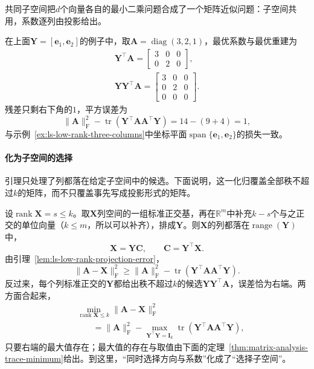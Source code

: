 共同子空间把$d$个向量各自的最小二乘问题合成了一个矩阵近似问题：子空间共用，系数逐列由投影给出。

在上面$\bm Y=[\bm e_1,\bm e_2]$的例子中，取$\bm A=\operatorname{diag}(3,2,1)$，最优系数与最优重建为
\[
 \begin{gathered}
 \bm Y^\top\bm A=\begin{bmatrix}3&0&0\\0&2&0\end{bmatrix},\\
 \bm Y\bm Y^\top\bm A=\begin{bmatrix}3&0&0\\0&2&0\\0&0&0\end{bmatrix}.
 \end{gathered}
\]
残差只剩右下角的$1$，平方误差为
\[
 \lVert\bm A\rVert_{\mathrm F}^2-\operatorname{tr}(\bm Y^\top\bm A\bm A^\top\bm Y)=14-(9+4)=1 ,
\]
与示例~\ref{ex:ls-low-rank-three-columns}中坐标平面$\operatorname{span}\{\bm e_1,\bm e_2\}$的损失一致。

\paragraph{化为子空间的选择}
引理只处理了列都落在给定子空间中的候选。下面说明，这一化归覆盖全部秩不超过$k$的矩阵，而不只覆盖事先写成投影形式的矩阵。

设$\operatorname{rank}\bm X=s\leq k$。取$\bm X$列空间的一组标准正交基，再在$\mathbb R^m$中补充$k-s$个与之正交的单位向量（$k\leq m$，所以可以补齐），排成$\bm Y$。则$\bm X$的列都落在$\operatorname{range}(\bm Y)$中，
\[
 \bm X=\bm Y\bm C,\qquad \bm C=\bm Y^\top\bm X .
\]
由引理~\ref{lem:ls-low-rank-projection-error}，
\[
 \lVert\bm A-\bm X\rVert_{\mathrm F}^2\geq\lVert\bm A\rVert_{\mathrm F}^2-\operatorname{tr}(\bm Y^\top\bm A\bm A^\top\bm Y).
\]
反过来，每个列标准正交的$\bm Y$都给出秩不超过$k$的候选$\bm Y\bm Y^\top\bm A$，误差恰为右端。两方面合起来，
\begin{equation}
 \begin{aligned}
 &\min_{\operatorname{rank}\bm X\leq k}\lVert\bm A-\bm X\rVert_{\mathrm F}^2\\
 &\qquad=\lVert\bm A\rVert_{\mathrm F}^2-\max_{\bm Y^\top\bm Y=\bm I_k}\operatorname{tr}(\bm Y^\top\bm A\bm A^\top\bm Y),
 \end{aligned}
 \label{eq:ls-low-rank-subspace-reduction}
\end{equation}
只要右端的最大值存在；最大值的存在与取值由下面的定理~\ref{thm:matrix-analysis-trace-minimum}给出。到这里，“同时选择方向与系数”化成了“选择子空间”。

